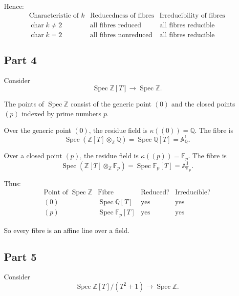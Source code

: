 Hence:
\[
\begin{array}{c|c|c}
	\text{Characteristic of }k
	&
	\text{Reducedness of fibres}
	&
	\text{Irreducibility of fibres}
	\\
	\hline
	\operatorname{char}k\neq 2
	&
	\text{all fibres reduced}
	&
	\text{all fibres reducible}
	\\
	\operatorname{char}k=2
	&
	\text{all fibres nonreduced}
	&
	\text{all fibres reducible}
\end{array}
\]

\subsection{Part 4}

Consider
\[
\operatorname{Spec}\mathbb{Z}[T]
\longrightarrow
\operatorname{Spec}\mathbb{Z}.
\]

The points of \(\operatorname{Spec}\mathbb Z\) consist of the generic point \((0)\) and the closed points \((p)\) indexed by prime numbers \(p\).

Over the generic point \((0)\), the residue field is \(\kappa((0))=\mathbb Q\). The fibre is
\[
\operatorname{Spec}\left(\mathbb{Z}[T]\otimes_{\mathbb{Z}}\mathbb{Q}\right)
=
\operatorname{Spec}\mathbb{Q}[T]
=
\mathbb{A}^1_{\mathbb{Q}}.
\]

Over a closed point \((p)\), the residue field is \(\kappa((p))=\mathbb F_p\). The fibre is
\[
\operatorname{Spec}\left(\mathbb{Z}[T]\otimes_{\mathbb{Z}}\mathbb{F}_p\right)
=
\operatorname{Spec}\mathbb{F}_p[T]
=
\mathbb{A}^1_{\mathbb{F}_p}.
\]

Thus:
\[
\begin{array}{c|c|c|c}
	\text{Point of }\operatorname{Spec}\mathbb{Z}
	&
	\text{Fibre}
	&
	\text{Reduced?}
	&
	\text{Irreducible?}
	\\
	\hline
	(0)
	&
	\operatorname{Spec}\mathbb{Q}[T]
	&
	\text{yes}
	&
	\text{yes}
	\\
	(p)
	&
	\operatorname{Spec}\mathbb{F}_p[T]
	&
	\text{yes}
	&
	\text{yes}
\end{array}
\]

So every fibre is an affine line over a field.

\subsection{Part 5}

Consider
\[
\operatorname{Spec}\mathbb{Z}[T]/(T^2+1)
\longrightarrow
\operatorname{Spec}\mathbb{Z}.
\]

